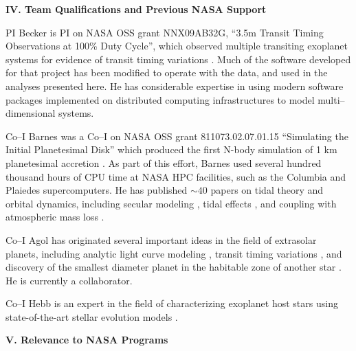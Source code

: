 \bigskip
\centerline{\bf IV. Team Qualifications and Previous NASA Support}
\smallskip

PI Becker is PI on NASA OSS grant NNX09AB32G, ``3.5m Transit Timing
Observations at 100\% Duty Cycle'', which observed multiple transiting
exoplanet systems for evidence of transit timing variations
\citep{2011ApJ...731..123K, 2013ApJ...764....8K, 2013ApJ...764L..17B,
  2013arXiv1304.5713K}.  Much of the software developed for that
project has been modified to operate with the \kepler data, and used in
the analyses presented here.  He has considerable expertise in using
modern software packages implemented on distributed computing
infrastructures to model multi--dimensional systems.  


Co--I Barnes was a Co--I on NASA OSS grant 811073.02.07.01.15
``Simulating the Initial Planetesimal Disk'' which produced the first
N-body simulation of 1 km planetesimal accretion
\citep{Barnes09_1km}. As part of this effort, Barnes used several hundred thousand hours of CPU time at NASA HPC facilities, such as the Columbia and Plaiedes supercomputers. He has published $\sim 40$ papers on tidal theory and orbital dynamics, including secular modeling \citep{BarnesGreenberg06a}, tidal effects , and coupling with atmospheric mass loss \citep{Jackson10,Barnes13}. 

Co--I Agol has originated several important ideas in the field of
extrasolar planets, including analytic light curve
modeling \citep{2002ApJ...580L.171M}, transit timing
variations \citep{2005MNRAS.359..567A}, and discovery of the smallest
diameter planet in the habitable zone of another
star \citep{2013arXiv1304.7387B}.  He is currently a \kepler
collaborator.

Co--I Hebb is an expert in the field of characterizing exoplanet host
stars using state-of-the-art stellar evolution
models \citep[e.g.][]{Hebb2009,Hebb2010,Bouchy2010,Yilen2013}.

\bigskip
\centerline{\bf V. Relevance to NASA Programs}
\smallskip

